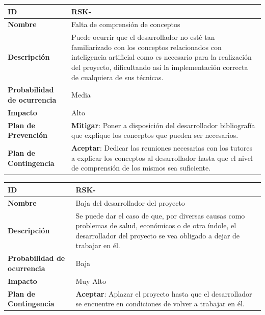 \begin{center}
	\begin{tabular}{ | p{5.6cm} | p{8.5cm} | } 
		\hline
		
		\textbf{ID} & RSK-\arabic{contador_riesgos}
		{contador_riesgos} \\
		
		\hline 
		\textbf{Nombre} &
		Falta de comprensión de conceptos\\ 
		
		\hline
		\textbf{Descripción} & 
		Puede ocurrir que el desarrollador no esté tan familiarizado con los conceptos relacionados con inteligencia artificial como es necesario para la realización del proyecto, dificultando así la implementación correcta de cualquiera de sus técnicas.\\
		
		\hline 
		\textbf{Probabilidad de ocurrencia} &
		Media\\
		
		\hline 
		\textbf{Impacto} &
		Alto\\
		
		\hline 
		\textbf{Plan de Prevención} &
		\textbf{Mitigar}: Poner a disposición del desarrollador bibliografía que explique los conceptos que pueden ser necesarios.\\
		
		\hline 
		\textbf{Plan de Contingencia} &
		\textbf{Aceptar}: Dedicar las reuniones necesarias con los tutores a explicar los conceptos al desarrollador hasta que el nivel de comprensión de los mismos sea suficiente.\\
		
		
		\hline
	\end{tabular}
\end{center}

\begin{center}
	\begin{tabular}{ | p{5.6cm} | p{8.5cm} | } 
		\hline
		
		\textbf{ID} & RSK-\arabic{contador_riesgos}
		{contador_riesgos} \\
		
		\hline 
		\textbf{Nombre} &
		Baja del desarrollador del proyecto\\ 
		
		\hline
		\textbf{Descripción} & 
		Se puede dar el caso de que, por diversas causas como problemas de salud, económicos o de otra índole, el desarrollador del proyecto se vea obligado a dejar de trabajar en él.\\
		
		\hline 
		\textbf{Probabilidad de ocurrencia} &
		Baja\\
		
		\hline 
		\textbf{Impacto} &
		Muy Alto\\
		
		
		\hline 
		\textbf{Plan de Contingencia} &
		\textbf{Aceptar}: Aplazar el proyecto hasta que el desarrollador se encuentre en condiciones de volver a trabajar en él.\\
		
		
		\hline
	\end{tabular}
\end{center}

